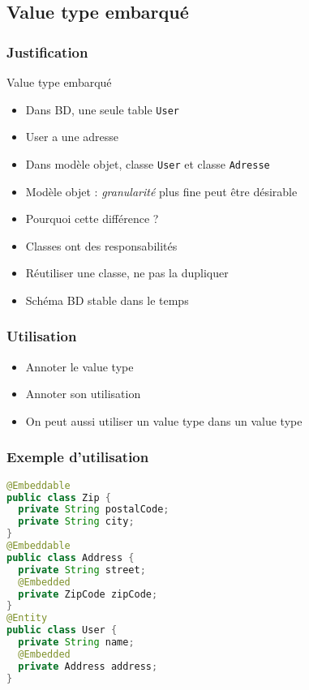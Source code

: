 \documentclass[english, french]{beamer}
\begin{document}
\subsection{Value type embarqué}
\begin{frame}
	\frametitle{Justification}
	\begin{exampleblock}{Value type embarqué}
		\begin{itemize}
			\item Dans BD, une seule table \texttt{User}
			\item User a une adresse
			\item Dans modèle objet, classe \texttt{User} et classe \texttt{Adresse}
		\end{itemize}
	\end{exampleblock}
	\begin{itemize}
		\item Modèle objet : \emph{granularité} plus fine peut être désirable
		\item Pourquoi cette différence ? \pause
		\item Classes ont des responsabilités
		\item Réutiliser une classe, ne pas la dupliquer
		\item Schéma BD stable dans le temps
	\end{itemize}
\end{frame}

\begin{frame}
	\frametitle{Utilisation}
	\begin{itemize}
		\item Annoter le value type 
		\item Annoter son utilisation 
		\item On peut aussi utiliser un value type dans un value type
	\end{itemize}
\end{frame}

\begin{frame}[fragile]
	\frametitle{Exemple d’utilisation}
		\begin{lstlisting}[language=Java]
@Embeddable
public class Zip {
  private String postalCode;
  private String city;
}
@Embeddable
public class Address {
  private String street;
  @Embedded
  private ZipCode zipCode;
}
@Entity
public class User {
  private String name;
  @Embedded
  private Address address;
}
		\end{lstlisting}
\end{frame}
\end{document}
